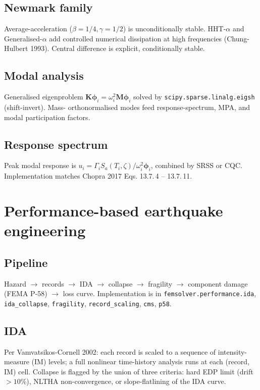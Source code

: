 \documentclass[11pt,a4paper]{report}
\newcommand{\bs}[1]{\boldsymbol{#1}}
\begin{document}
\section{Newmark family}

Average-acceleration ($\beta = 1/4, \gamma = 1/2$) is
unconditionally stable.  HHT-$\alpha$ and Generalised-$\alpha$ add
controlled numerical dissipation at high frequencies (Chung-Hulbert
1993).  Central difference is explicit, conditionally stable.

\section{Modal analysis}

Generalised eigenproblem $\bs K \bs\phi_i = \omega_i^2 \bs M \bs\phi_i$
solved by \texttt{scipy.sparse.linalg.eigsh} (shift-invert).  Mass-
orthonormalised modes feed response-spectrum, MPA, and modal
participation factors.

\section{Response spectrum}

Peak modal response is $u_i = \Gamma_i S_a(T_i, \zeta) /
\omega_i^2 \bs\phi_i$, combined by SRSS or CQC.  Implementation
matches Chopra 2017 Eqs. 13.7.\,4 -- 13.7.\,11.

\chapter{Performance-based earthquake engineering}
\label{ch:pbe}

\section{Pipeline}

Hazard $\to$ records $\to$ IDA $\to$ collapse $\to$ fragility $\to$
component damage (FEMA P-58) $\to$ loss curve.  Implementation is
in \texttt{femsolver.performance.ida}, \texttt{ida\_collapse},
\texttt{fragility}, \texttt{record\_scaling}, \texttt{cms},
\texttt{p58}.

\section{IDA}

Per Vamvatsikos-Cornell 2002: each record is scaled to a sequence of
intensity-measure (IM) levels; a full nonlinear time-history analysis
runs at each (record, IM) cell.  Collapse is flagged by the union of
three criteria: hard EDP limit (drift $> 10\%$), NLTHA non-convergence,
or slope-flatlining of the IDA curve.
\end{document}
